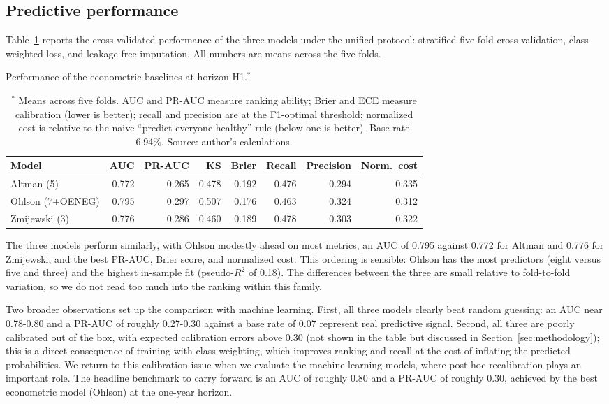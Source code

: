 \documentclass[12pt,a4paper]{article}
\begin{document}
\subsection{Predictive performance}

Table~\ref{tab:econ-cv} reports the cross-validated performance of the three
models under the unified protocol: stratified five-fold cross-validation,
class-weighted loss, and leakage-free imputation. All numbers are means across
the five folds.

\begin{table}[ht]
\centering
\caption{Performance of the econometric baselines at horizon H1.$^{*}$}
\label{tab:econ-cv}
\small
\begin{tabular}{lrrrrrrr}
\toprule
Model & AUC & PR-AUC & KS & Brier & Recall & Precision & Norm.\ cost \\
\midrule
Altman (5)        & 0.772 & 0.265 & 0.478 & 0.192 & 0.476 & 0.294 & 0.335 \\
Ohlson (7+OENEG)  & 0.795 & 0.297 & 0.507 & 0.176 & 0.463 & 0.324 & 0.312 \\
Zmijewski (3)     & 0.776 & 0.286 & 0.460 & 0.189 & 0.478 & 0.303 & 0.322 \\
\bottomrule
\end{tabular}
\caption*{\footnotesize $^{*}$ Means across five folds. AUC and PR-AUC measure ranking ability; Brier and ECE measure calibration (lower is better); recall and precision are at the F1-optimal threshold; normalized cost is relative to the naive ``predict everyone healthy'' rule (below one is better). Base rate 6.94\%. Source: author's calculations.}
\end{table}

The three models perform similarly, with Ohlson modestly ahead on most
metrics, an AUC of 0.795 against 0.772 for Altman and 0.776 for Zmijewski,
and the best PR-AUC, Brier score, and normalized cost. This ordering is
sensible: Ohlson has the most predictors (eight versus five and three) and the
highest in-sample fit (pseudo-$R^2$ of 0.18). The differences between the three are small relative to fold-to-fold
variation, so we do not read too much into the ranking within this family.

Two broader observations set up the comparison with machine learning. First,
all three models clearly beat random guessing: an AUC near 0.78-0.80 and a
PR-AUC of roughly 0.27-0.30 against a base rate of 0.07 represent real
predictive signal. Second, all three are poorly calibrated out of the box, with
expected calibration errors above 0.30 (not shown in the table but discussed
in Section~\ref{sec:methodology}); this is a direct consequence of training
with class weighting, which improves ranking and recall at the cost of
inflating the predicted probabilities. We return to this calibration issue
when we evaluate the machine-learning models, where post-hoc recalibration
plays an important role. The headline benchmark to carry forward is an AUC of
roughly 0.80 and a PR-AUC of roughly 0.30, achieved by the best econometric
model (Ohlson) at the one-year horizon.
\end{document}
